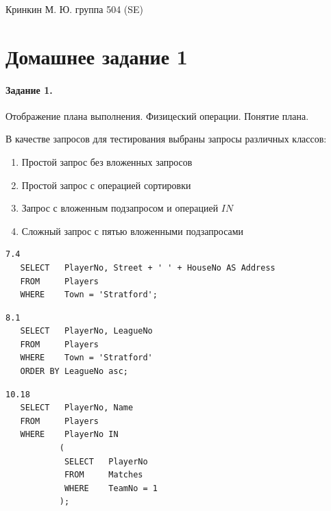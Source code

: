 \documentclass[a4paper,12pt]{article}
\begin{document}
\sloppy

\lstset{
	basicstyle=\small,
	stringstyle=\ttfamily,
	showstringspaces=false,
	columns=fixed,
	breaklines=true,
	numbers=right,
	numberstyle=\tiny
}

\newtheorem{Def}{Определение}[section]
\newtheorem{Th}{Теорема}
\newtheorem{Lem}[Th]{Лемма}
\newenvironment{Proof}
	{\par\noindent{\bf Доказательство.}}
	{\hfill$\scriptstyle\blacksquare$}
\newenvironment{Solution}
	{\par\noindent{\bf Решение.}}
	{\hfill$\scriptstyle\blacksquare$}


\begin{flushright}
	Кринкин М. Ю. группа 504 (SE)
\end{flushright}

\section{Домашнее задание 1}

\paragraph{Задание 1.} Отображение плана выполнения. Физицеский операции. Понятие плана.

В качестве запросов для тестирования выбраны запросы различных классов:
\begin{enumerate}
\item Простой запрос без вложенных запросов

\item Простой запрос с операцией сортировки

\item Запрос с вложенным подзапросом и операцией $IN$

\item Сложный запрос с пятью вложенными подзапросами
\end{enumerate}

\begin{lstlisting}
7.4
   SELECT   PlayerNo, Street + ' ' + HouseNo AS Address
   FROM     Players
   WHERE    Town = 'Stratford';
\end{lstlisting}

\begin{lstlisting}
8.1
   SELECT   PlayerNo, LeagueNo
   FROM     Players
   WHERE    Town = 'Stratford'
   ORDER BY LeagueNo asc;
\end{lstlisting}

\begin{lstlisting}
10.18
   SELECT   PlayerNo, Name
   FROM     Players
   WHERE    PlayerNo IN 
           (
            SELECT   PlayerNo
            FROM     Matches
            WHERE    TeamNo = 1
           );
\end{lstlisting}
\end{document}
